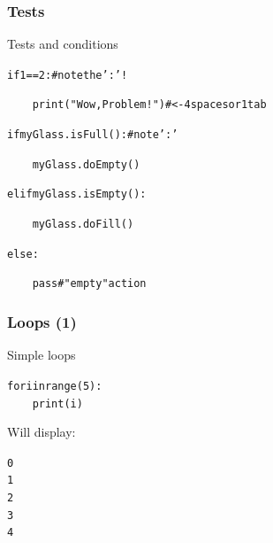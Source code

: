 \documentclass[xcolor=pdftex,dvipsnames,table,mathserif]{beamer}
\begin{document}
\begin{frame}

  \frametitle{Tests}

  \begin{block}{Tests and conditions}
    \begin{alltt}
      if 1 == 2 :               \# note the ':' !

      ~~~~    print("Wow, Problem!") \# <- 4 spaces or 1 tab


      if myGlass.isFull():   \# note ':'

      ~~~~    myGlass.doEmpty()

      elif myGlass.isEmpty():

      ~~~~    myGlass.doFill()

      else:

      ~~~~    pass                  \# "empty" action

    \end{alltt}
  \end{block}
\end{frame}

\begin{frame}
  \frametitle{Loops (1)}

  \begin{block}{Simple loops}
    \begin{alltt}
      for i in range( 5 ):\\
      ~~~~     print(i)
    \end{alltt}
    Will display:
    \begin{alltt}
      0\\
      1\\
      2\\
      3\\
      4\\
    \end{alltt}
  \end{block}
\end{frame}
\end{document}
